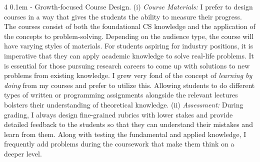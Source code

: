 \documentclass[10pt]{article}
\makeatletter
\def \paragraph {%
    \@startsection{paragraph}%
        {4}%
        \z@%
        {0.1em}
        {-\fontdimen 6 \font}%
        {\normalfont \bfseries}%
    }
\makeatother
\begin{document}
\paragraph{Growth-focused Course Design.}
(i) \textit{Course Materials:} I prefer to design courses in a way that gives the students the ability to measure their progress. 
%
The courses consist of both the foundational CS knowledge and the application of the concepts to problem-solving. Depending on the audience type, 
the course will have varying styles of materials.
For students aspiring for industry positions, it is imperative that they can apply academic knowledge to solve real-life problems. It is essential for those pursuing research careers to come up with solutions to new problems from existing knowledge.
I grew very fond of the concept of \textit{learning by doing} from my courses and prefer to utilize this. Allowing students to do different types of written or programming assignments alongside the relevant lectures bolsters their understanding of theoretical knowledge.
%
%
(ii) \textit{Assessment:} During grading, I always design fine-grained rubrics with lower stakes and provide detailed feedback to the students so that they can understand their mistakes and learn from them. Along with testing the fundamental and applied knowledge, I frequently add problems during the coursework that make them think on a deeper level. 

\end{document}
